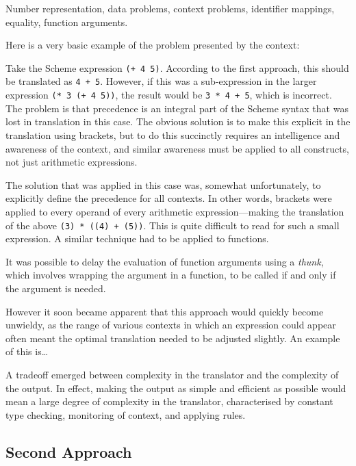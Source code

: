 Number representation, data problems, context problems, identifier mappings,
equality, function arguments.

Here is a very basic example of the problem presented by the context:
\begin{framed}
Take the Scheme expression \texttt{(+ 4 5)}. According to the first approach,
this should be translated as \texttt{4 + 5}. However, if this was a
sub-expression in the larger expression \texttt{(*~3~(+~4~5))}, the result would
be \texttt{3~*~4~+~5}, which is incorrect. The problem is that precedence is
an integral part of the Scheme syntax that was lost in translation in this case.
The obvious solution is to make this explicit in the translation using brackets,
but to do this succinctly requires an intelligence and awareness of the context,
and similar awareness must be applied to all constructs, not just arithmetic
expressions.
\end{framed}
The solution that was applied in this case was, somewhat unfortunately, to
explicitly define the precedence for all contexts. In other words, brackets were
applied to every operand of every arithmetic expression---making the translation
of the above \texttt{(3) * ((4) + (5))}. This is quite difficult to read for
such a small expression. A similar technique had to be applied to functions.

It was possible to delay the evaluation of function arguments using a
\emph{thunk}, which involves wrapping the argument in a function, to be called
if and only if the argument is needed.

However it soon became apparent that this approach would quickly become
unwieldy, as the range of various contexts in which an expression could appear
often meant the optimal translation needed to be adjusted slightly. An example
of this is\ldots

A tradeoff emerged between complexity in the translator and the complexity of
the output. In effect, making the output as simple and efficient as
possible would mean a large degree of complexity in the translator,
characterised by constant type checking, monitoring of context, and applying
rules.

\subsection{Second Approach}

